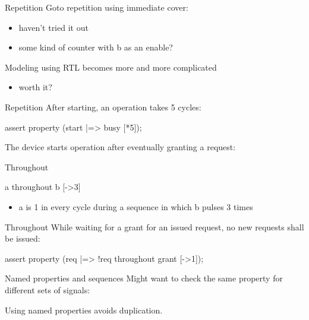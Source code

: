 \documentclass{beamer}
\begin{document}
\begin{frame}[fragile]{Repetition}
Goto repetition using immediate cover:

\begin{itemize}
 \item haven't tried it out
 \item some kind of counter with b as an enable?
\end{itemize}

\pause
Modeling using RTL becomes more and more complicated
\begin{itemize}
 \item worth it?
\end{itemize}
\end{frame}


\begin{frame}[fragile]{Repetition}
After starting, an operation takes 5 cycles:

\begin{semiverbatim}
assert property (start |=> busy [*5]);
\end{semiverbatim}

\pause
The device starts operation after eventually granting a request:

\end{frame}


\begin{frame}[fragile]{Throughout}
\begin{semiverbatim}
a throughout b [->3]
\end{semiverbatim}

\begin{itemize}
 \item a is 1 in every cycle during a sequence in which b pulses 3 times
\end{itemize}
\end{frame}


\begin{frame}[fragile]{Throughout}
While waiting for a grant for an issued request, no new requests shall be issued:

\begin{semiverbatim}
assert property (req |=> !req throughout grant [->1]);
\end{semiverbatim}
\end{frame}


\begin{frame}[fragile]{Named properties and sequences}
Might want to check the same property for different sets of signals:


Using named properties avoids duplication.
\end{frame}
\end{document}
